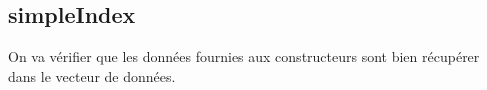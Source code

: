 
\subsection{simpleIndex}

On va vérifier que les données fournies aux constructeurs sont bien récupérer dans le vecteur de données.
